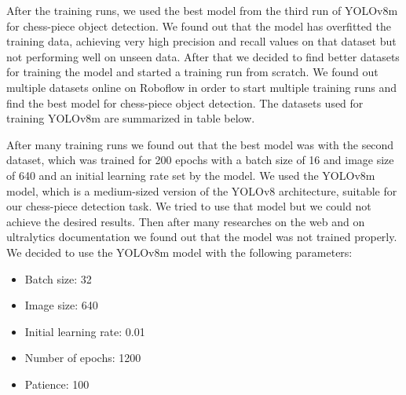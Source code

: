 After the training runs, we used the best model from the third run of YOLOv8m for chess-piece object detection.
We found out that the model has overfitted the training data, achieving very high precision and recall values on that dataset but not performing well on unseen data.
\newline
After that we decided to find better datasets for training the model and started a training run from scratch.
We found out multiple datasets online on Roboflow in order to start multiple training runs and find the best model for chess-piece object detection.
The datasets used for training YOLOv8m are summarized in table below.
\begin{table}[ht]
\centering
\caption{Datasets used for training YOLOv8m.}
\label{tab:YOLOv8-datasets}
\end{table}

After many training runs we found out that the best model was with the second dataset,
which was trained for 200 epochs with a batch size of 16 and image size of 640 and an initial learning rate set by the model.
We used the YOLOv8m model, which is a medium-sized version of the YOLOv8 architecture, suitable for our chess-piece detection task.
\newline
We tried to use that model but we could not achieve the desired results.
Then after many researches on the web and on ultralytics documentation we found out that the model was not trained properly.
We decided to use the YOLOv8m model with the following parameters:
\begin{itemize}
    \item Batch size: 32
    \item Image size: 640
    \item Initial learning rate: 0.01
    \item Number of epochs: 1200
    \item Patience: 100
\end{itemize}

